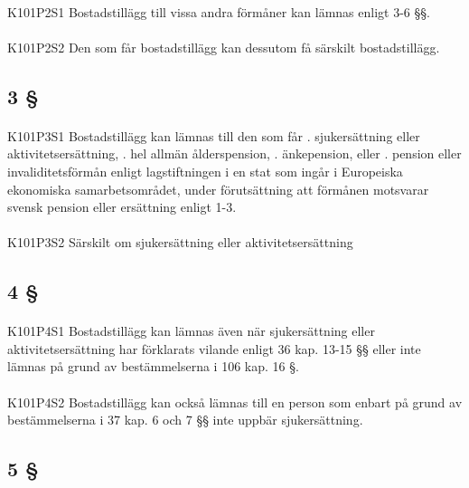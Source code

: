 \documentclass[a4paper,notitlepage,openany,10pt]{book}
\begin{document}
\paragraph*{}
{\tiny K101P2S1}
Bostadstillägg till vissa andra förmåner kan lämnas enligt 3-6 §§.
\paragraph*{}
{\tiny K101P2S2}
Den som får bostadstillägg kan dessutom få särskilt bostadstillägg.
\subsection*{3 §}
\paragraph*{}
{\tiny K101P3S1}
Bostadstillägg kan lämnas till den som får
. sjukersättning eller aktivitetsersättning,
. hel allmän ålderspension,
. änkepension, eller
. pension eller invaliditetsförmån enligt lagstiftningen i en stat som ingår i Europeiska ekonomiska samarbetsområdet, under förutsättning att förmånen motsvarar svensk pension eller ersättning enligt 1-3.
\paragraph*{}
{\tiny K101P3S2}
Särskilt om sjukersättning eller aktivitetsersättning
\subsection*{4 §}
\paragraph*{}
{\tiny K101P4S1}
Bostadstillägg kan lämnas även när sjukersättning eller aktivitetsersättning har förklarats vilande enligt 36 kap. 13-15 §§ eller inte lämnas på grund av bestämmelserna i 106 kap. 16 §.
\paragraph*{}
{\tiny K101P4S2}
Bostadstillägg kan också lämnas till en person som enbart på grund av bestämmelserna i 37 kap. 6 och 7 §§ inte uppbär sjukersättning.
\subsection*{5 §}
\end{document}
